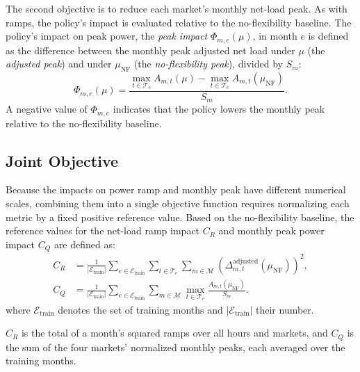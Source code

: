 \documentclass{UNCC-thesis}
\begin{document}
The second objective is to reduce each market's monthly net-load peak. As with ramps,
the policy's impact is evaluated relative to the no-flexibility baseline. The policy's
impact on peak power, the \emph{peak impact} \(\Phi_{m,e}(\mu)\), in month \(e\) is
defined as the difference between the monthly peak adjusted net load under \(\mu\) (the
\emph{adjusted peak}) and under \(\mu_{\mathrm{NF}}\) (the \emph{no-flexibility peak}),
divided by \(S_m\):
\begin{equation}
  \Phi_{m,e}(\mu)
  =
  \frac{\displaystyle\max_{t\in\mathcal T_e} A_{m,t}(\mu)
        -\max_{t\in\mathcal T_e} A_{m,t}(\mu_{\mathrm{NF}})}{S_m}.
  \label{eq:peak-impact}
\end{equation}
A negative value of \(\Phi_{m,e}\) indicates that the policy lowers the monthly peak
relative to the no-flexibility baseline.

\subsection{Joint Objective}
\label{subsec:problem-normalization}

Because the impacts on power ramp and monthly peak have different numerical scales,
combining them into a single objective function requires normalizing each metric by a
fixed positive reference value. Based on the no-flexibility baseline, the reference
values for the net-load ramp impact \(C_R\) and monthly peak power impact \(C_Q\) are
defined as:
\begin{align}
  C_R
  &=
  \frac{1}{|\mathcal E_{\mathrm{train}}|}
  \sum_{e\in\mathcal E_{\mathrm{train}}}
  \sum_{t\in\mathcal T_e}\sum_{m\in\mathcal M}
  \left(\Delta^{\mathrm{adjusted}}_{m,t}(\mu_{\mathrm{NF}})\right)^2,
  \label{eq:ramp-reference}\\
  C_Q
  &=
  \frac{1}{|\mathcal E_{\mathrm{train}}|}
  \sum_{e\in\mathcal E_{\mathrm{train}}}\sum_{m\in\mathcal M}
  \max_{t\in\mathcal T_e}\frac{A_{m,t}(\mu_{\mathrm{NF}})}{S_m}.
  \label{eq:peak-reference}
\end{align}
where \(\mathcal E_{\mathrm{train}}\) denotes the set of training months and
\(|\mathcal E_{\mathrm{train}}|\) their number.

\(C_R\) is the total of a month's squared ramps over all hours and markets, and \(C_Q\) is the
sum of the four markets' normalized monthly peaks, each averaged over the training months.
\end{document}
